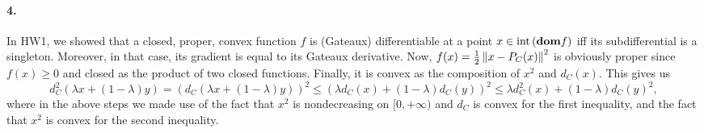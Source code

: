 \documentclass[10pt]{article}
\begin{document}
\paragraph{4.}
In HW1, we showed that a closed, proper, convex function $f$ is (Gateaux)
differentiable at a point $x \in \mathrm{int}\left( \textbf{dom} f \right)$ iff its
subdifferential is a singleton. Moreover, in that case, its gradient is equal
to its Gateaux derivative. Now, $f(x) = \frac{1}{2} \left \| x - P_C(x) \right \|^2$ is
obviously proper since $f(x) \geq 0$ and closed as the product of two closed
functions. Finally, it is convex as the composition of $x^2$ and $d_C(x)$.
This gives us
\[
    d^2_C(\lambda x + (1 - \lambda) y) =
    \left( d_C(\lambda x + (1 - \lambda) y) \right)^2 \leq
    \left( \lambda d_C(x) + (1 - \lambda) d_C(y) \right)^2 \leq
    \lambda d_C^2(x) + (1 - \lambda) d_C(y)^2,
\]
where in the above steps we made use of the fact that $x^2$ is nondecreasing on
$[0, +\infty)$ and $d_C$ is convex for the first inequality, and the fact that
$x^2$ is convex for the second inequality.
\end{document}
